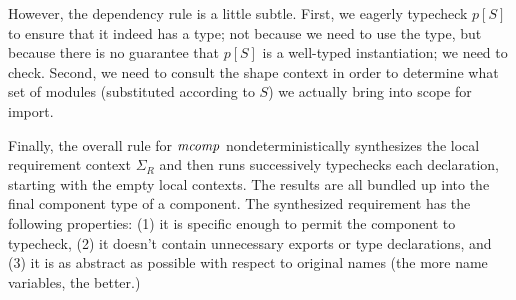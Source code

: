 However, the dependency rule is a little subtle.  First, we eagerly
typecheck $p[S]$ to ensure that it indeed has a type; not because we
need to use the type, but because there is no guarantee that $p[S]$
is a well-typed instantiation; we need to check.  Second, we need
to consult the shape context in order to determine what set of modules
(substituted according to $S$) we actually bring into scope for import.

Finally, the overall rule for $\mathit{mcomp}$ nondeterministically synthesizes
the local requirement context $\Sigma_R$ and then runs successively
typechecks each declaration, starting with the empty local contexts.
The results are all bundled up into the final component type of a component.
The synthesized requirement has the following properties: (1) it is specific
enough to permit the component to typecheck, (2) it doesn't contain
unnecessary exports or type declarations, and (3) it is as abstract as possible
with respect to original names (the more name variables, the better.)
